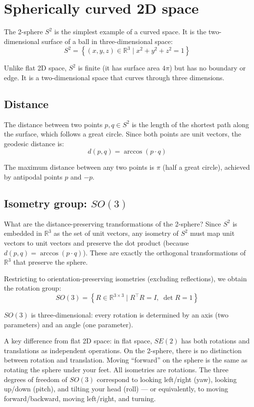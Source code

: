 \documentclass[twocolumn,10pt]{article}
\begin{document}
\section{Spherically curved 2D space}

The 2-sphere $S^2$ is the simplest example of a curved space. It is the two-dimensional surface of a ball in three-dimensional space:
\[
    S^2 = \left\{ (x, y, z) \in \mathbb{R}^3 \mid x^2 + y^2 + z^2 = 1 \right\}
\]

Unlike flat 2D space, $S^2$ is finite (it has surface area $4\pi$) but has no boundary or edge. It is a two-dimensional space that curves through three dimensions.

\subsection{Distance}

The distance between two points $p, q \in S^2$ is the length of the shortest path along the surface, which follows a great circle. Since both points are unit vectors, the geodesic distance is:
\[
    d(p, q) = \arccos(p \cdot q)
\]

The maximum distance between any two points is $\pi$ (half a great circle), achieved by antipodal points $p$ and $-p$.

\subsection{Isometry group: $SO(3)$}

What are the distance-preserving transformations of the 2-sphere? Since $S^2$ is embedded in $\mathbb{R}^3$ as the set of unit vectors, any isometry of $S^2$ must map unit vectors to unit vectors and preserve the dot product (because $d(p,q) = \arccos(p \cdot q)$). These are exactly the orthogonal transformations of $\mathbb{R}^3$ that preserve the sphere.

Restricting to orientation-preserving isometries (excluding reflections), we obtain the rotation group:
\[
    SO(3) = \left\{ R \in \mathbb{R}^{3 \times 3} \mid R^\top R = I, \; \det R = 1 \right\}
\]

$SO(3)$ is three-dimensional: every rotation is determined by an axis (two parameters) and an angle (one parameter).

A key difference from flat 2D space: in flat space, $SE(2)$ has both rotations and translations as independent operations. On the 2-sphere, there is no distinction between rotation and translation. Moving ``forward'' on the sphere is the same as rotating the sphere under your feet. All isometries are rotations. The three degrees of freedom of $SO(3)$ correspond to looking left/right (yaw), looking up/down (pitch), and tilting your head (roll) --- or equivalently, to moving forward/backward, moving left/right, and turning.
\end{document}
